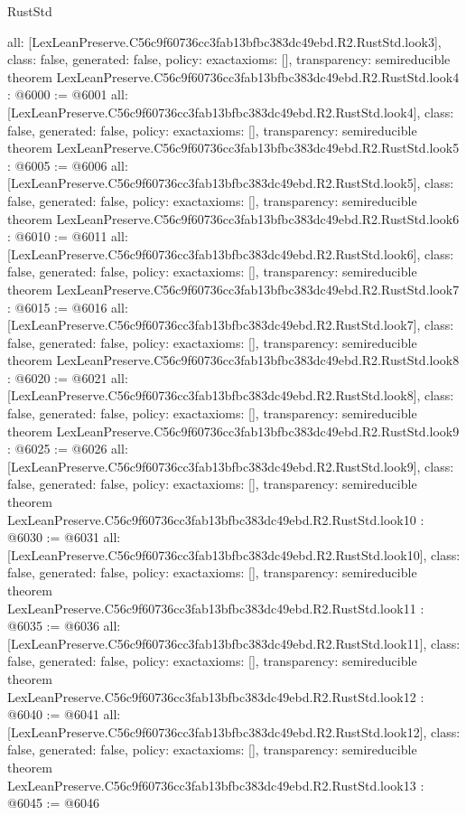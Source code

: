 \begin{lexlean}{RustStd}
\begin{coremodule}
{  all: [LexLeanPreserve.C56c9f60736cc3fab13bfbc383dc49ebd.R2.RustStd.look3],
  class: false,
  generated: false,
  policy: exact{axioms: []},
  transparency: semireducible
}
theorem LexLeanPreserve.C56c9f60736cc3fab13bfbc383dc49ebd.R2.RustStd.look4 : @6000 := @6001 {
  all: [LexLeanPreserve.C56c9f60736cc3fab13bfbc383dc49ebd.R2.RustStd.look4],
  class: false,
  generated: false,
  policy: exact{axioms: []},
  transparency: semireducible
}
theorem LexLeanPreserve.C56c9f60736cc3fab13bfbc383dc49ebd.R2.RustStd.look5 : @6005 := @6006 {
  all: [LexLeanPreserve.C56c9f60736cc3fab13bfbc383dc49ebd.R2.RustStd.look5],
  class: false,
  generated: false,
  policy: exact{axioms: []},
  transparency: semireducible
}
theorem LexLeanPreserve.C56c9f60736cc3fab13bfbc383dc49ebd.R2.RustStd.look6 : @6010 := @6011 {
  all: [LexLeanPreserve.C56c9f60736cc3fab13bfbc383dc49ebd.R2.RustStd.look6],
  class: false,
  generated: false,
  policy: exact{axioms: []},
  transparency: semireducible
}
theorem LexLeanPreserve.C56c9f60736cc3fab13bfbc383dc49ebd.R2.RustStd.look7 : @6015 := @6016 {
  all: [LexLeanPreserve.C56c9f60736cc3fab13bfbc383dc49ebd.R2.RustStd.look7],
  class: false,
  generated: false,
  policy: exact{axioms: []},
  transparency: semireducible
}
theorem LexLeanPreserve.C56c9f60736cc3fab13bfbc383dc49ebd.R2.RustStd.look8 : @6020 := @6021 {
  all: [LexLeanPreserve.C56c9f60736cc3fab13bfbc383dc49ebd.R2.RustStd.look8],
  class: false,
  generated: false,
  policy: exact{axioms: []},
  transparency: semireducible
}
theorem LexLeanPreserve.C56c9f60736cc3fab13bfbc383dc49ebd.R2.RustStd.look9 : @6025 := @6026 {
  all: [LexLeanPreserve.C56c9f60736cc3fab13bfbc383dc49ebd.R2.RustStd.look9],
  class: false,
  generated: false,
  policy: exact{axioms: []},
  transparency: semireducible
}
theorem LexLeanPreserve.C56c9f60736cc3fab13bfbc383dc49ebd.R2.RustStd.look10 : @6030 := @6031 {
  all: [LexLeanPreserve.C56c9f60736cc3fab13bfbc383dc49ebd.R2.RustStd.look10],
  class: false,
  generated: false,
  policy: exact{axioms: []},
  transparency: semireducible
}
theorem LexLeanPreserve.C56c9f60736cc3fab13bfbc383dc49ebd.R2.RustStd.look11 : @6035 := @6036 {
  all: [LexLeanPreserve.C56c9f60736cc3fab13bfbc383dc49ebd.R2.RustStd.look11],
  class: false,
  generated: false,
  policy: exact{axioms: []},
  transparency: semireducible
}
theorem LexLeanPreserve.C56c9f60736cc3fab13bfbc383dc49ebd.R2.RustStd.look12 : @6040 := @6041 {
  all: [LexLeanPreserve.C56c9f60736cc3fab13bfbc383dc49ebd.R2.RustStd.look12],
  class: false,
  generated: false,
  policy: exact{axioms: []},
  transparency: semireducible
}
theorem LexLeanPreserve.C56c9f60736cc3fab13bfbc383dc49ebd.R2.RustStd.look13 : @6045 := @6046 {
}
\end{coremodule}
\end{lexlean}
